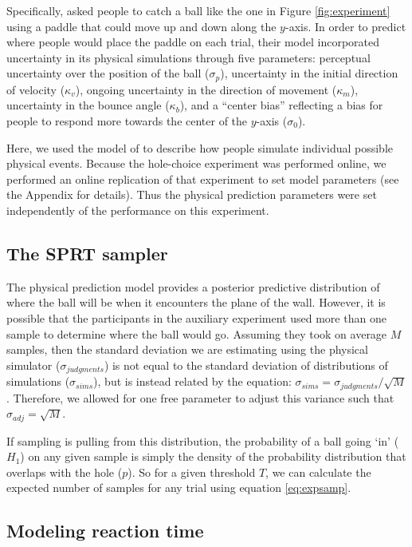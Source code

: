 \documentclass[10pt,letterpaper]{article}
\begin{document}
Specifically,  asked people to catch a ball like the one in Figure \ref{fig:experiment} using a paddle that could move up and down along the $y$-axis. In order to predict where people would place the paddle on each trial, their model incorporated uncertainty in its physical simulations through five parameters: perceptual uncertainty over the position of the ball ($\sigma_p$), uncertainty in the initial direction of velocity ($\kappa_v$), ongoing uncertainty in the direction of movement ($\kappa_m$), uncertainty in the bounce angle ($\kappa_b$), and a ``center bias'' reflecting a bias for people to respond more towards the center of the $y$-axis ($\sigma_0$).

Here, we used the model of  to describe how people simulate individual possible physical events. Because the hole-choice experiment was performed online, we performed an online replication of that experiment to set model parameters (see the Appendix for details). Thus the physical prediction parameters were set independently of the performance on this experiment.

\subsection{The SPRT sampler}

The physical prediction model provides a posterior predictive distribution of where the ball will be when it encounters the plane of the wall. However, it is possible that the participants in the auxiliary experiment used more than one sample to determine where the ball would go. Assuming they took on average $M$ samples, then the standard deviation we are estimating using the physical simulator ($\sigma_{judgments}$) is not equal to the standard deviation of distributions of simulations ($\sigma_{sims}$), but is instead related by the equation: $\sigma_{sims} = \sigma_{judgments} / \sqrt{M}$. Therefore, we allowed for one free parameter to adjust this variance such that $\sigma_{adj}=\sqrt{M}$.

If sampling is pulling from this distribution, the probability of a ball going `in' ($H_1$) on any given sample is simply the density of the probability distribution that overlaps with the hole ($p$). So for a given threshold $T$, we can calculate the expected number of samples for any trial using equation \ref{eq:expsamp}.

\subsection{Modeling reaction time}
\end{document}
